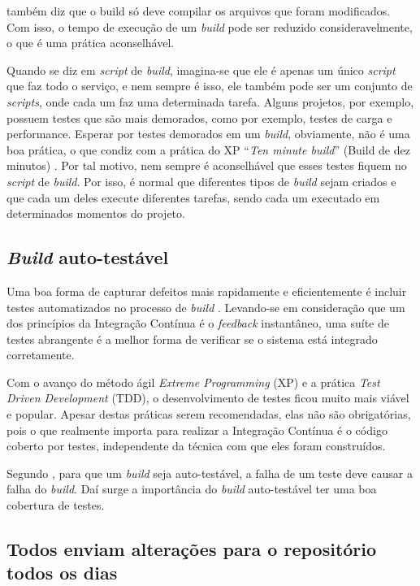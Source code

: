  também diz que o build só deve compilar os arquivos que foram modificados. Com isso, o tempo de execução de um \textit{build} pode ser reduzido consideravelmente, o que é uma prática aconselhável.

Quando se diz em \textit{script} de \textit{build}, imagina-se que ele é apenas um único \textit{script} que faz todo o serviço, e nem sempre é isso, ele também pode ser um conjunto de \textit{scripts}, onde cada um faz uma determinada tarefa. Alguns projetos, por exemplo, possuem testes que são mais demorados, como por exemplo, testes de carga e performance. Esperar por testes demorados em um \textit{build}, obviamente, não é uma boa prática, o que condiz com a prática do XP ``\textit{Ten minute build}'' (Build de dez minutos) \cite{BECK}. Por tal motivo, nem sempre é aconselhável que esses testes fiquem no \textit{script} de \textit{build}. Por isso, é normal que diferentes tipos de \textit{build} sejam criados e que cada um deles execute diferentes tarefas, sendo cada um executado em determinados momentos do projeto.

\subsection{\textit{Build} auto-testável}

Uma boa forma de capturar defeitos mais rapidamente e eficientemente é incluir testes automatizados no processo de \textit{build} \cite{FOWLER}. Levando-se em consideração que um dos princípios da Integração Contínua é o \textit{feedback} instantâneo, uma suíte de testes abrangente é a melhor forma de verificar se o sistema está integrado corretamente.

Com o avanço do método ágil \textit{Extreme Programming} (XP) e a prática \textit{Test Driven Development} (TDD), o desenvolvimento de testes ficou muito mais viável e popular. Apesar destas práticas serem recomendadas, elas não são obrigatórias, pois o que realmente importa para realizar a Integração Contínua é o código coberto por testes, independente da técnica com que eles foram construídos.

Segundo , para que um \textit{build} seja auto-testável, a falha de um teste deve causar a falha do \textit{build}. Daí surge a importância do \textit{build} auto-testável ter uma boa cobertura de testes.

\subsection{Todos enviam alterações para o repositório todos os dias}


